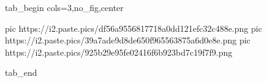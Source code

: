  
 
 
 
 


\ifcmt
  tab_begin cols=3,no_fig,center

     pic https://i2.paste.pics/df56a9556817718a0dd121efc32c488e.png
		 pic https://i2.paste.pics/39a7ade9d8de650f965563875a6d0e8e.png
		 pic https://i2.paste.pics/925b29e95fe02416f6b923bd7c19f7f9.png

  tab_end
\fi
